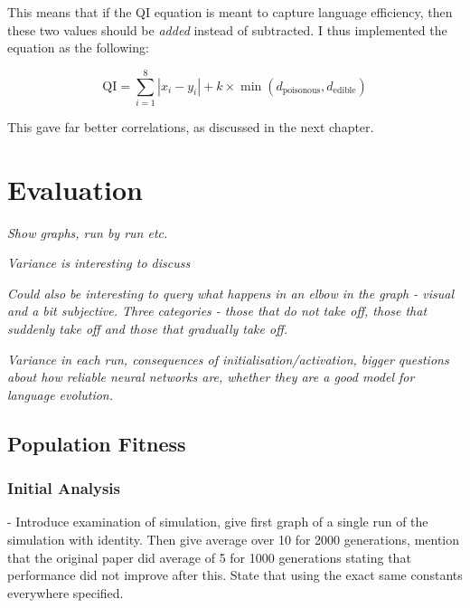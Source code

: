\documentclass[12pt,a4paper,twoside,openright]{report}
\begin{document}
This means that if the QI equation is meant to capture language efficiency, then these two values should be \emph{added} instead of subtracted. I thus implemented the equation as the following:

\begin{equation}
\label{equation:qibetter}
\mathrm{QI} = \sum^{8}_{i = 1} |x_i - y_i| + k \times \min (d_{\mathrm{poisonous}}, d_{\mathrm{edible}})
\end{equation}

This gave far better correlations, as discussed in the next chapter.


\chapter{Evaluation}

\emph{Show graphs, run by run etc.}

\emph{Variance is interesting to discuss}

\emph{Could also be interesting to query what happens in an elbow in the graph - visual and a bit subjective. Three categories - those that do not take off, those that suddenly take off and those that gradually take off.}

\emph{Variance in each run, consequences of initialisation/activation, bigger questions about how reliable neural networks are, whether they are a good model for language evolution. }

\section{Population Fitness}

\subsection{Initial Analysis}

 - Introduce examination of simulation, give first graph of a single run of the simulation with identity. Then give average over 10 for 2000 generations, mention that the original paper did average of 5 for 1000 generations stating that performance did not improve after this. State that using the exact same constants everywhere specified.
 
\end{document}
